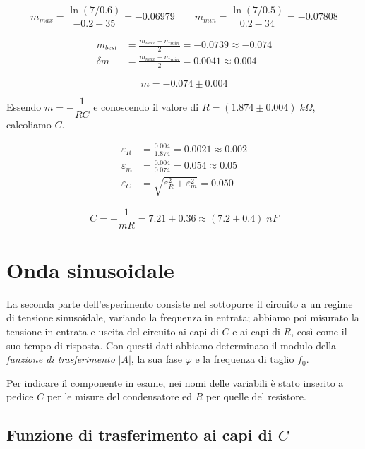 \documentclass[11pt, a4paper]{article}
\numberwithin{equation}{section} %
\begin{document}
\begin{equation*}
    m_{max} = \frac{\ln(7/0.6)}{- 0.2 - 35} = - 0.06979
    \qquad
    m_{min} = \frac{\ln(7/0.5)}{0.2 - 34} = - 0.07808
\end{equation*}

\begin{align*}
    m_{best} &= \frac{m_{max} + m_{min}}{2} = - 0.0739 \approx - 0.074 \\
    \delta m &= \frac{m_{max} - m_{min}}{2} = 0.0041 \approx 0.004
\end{align*}

\begin{equation}
    m = - 0.074 \pm 0.004
\end{equation}

\newpage

Essendo \(m = - \dfrac{1}{RC}\) e conoscendo il valore di \(R = (1.874 \pm 0.004) \; \unit{k\Omega}\), calcoliamo $C$.

\begin{align*}
    \varepsilon_R &= \frac{0.004}{1.874} = 0.0021 \approx 0.002 \\
    \varepsilon_m &= \frac{0.004}{0.074} = 0.054 \approx 0.05 \\
    \varepsilon_C &= \sqrt{\varepsilon_R^{2} + \varepsilon_m^{2}} = 0.050
\end{align*}

\begin{equation}
    C =  -\frac{1}{m R} = 7.21 \pm 0.36 \approx (7.2 \pm 0.4) \; \unit{nF}
\end{equation}

\section{Onda sinusoidale}

La seconda parte dell'esperimento consiste nel sottoporre il circuito a un regime di tensione sinusoidale, variando la frequenza in entrata; abbiamo poi misurato la tensione in entrata e uscita del circuito ai capi di $C$ e ai capi di $R$, così come il suo tempo di risposta. Con questi dati abbiamo determinato il modulo della \emph{funzione di trasferimento} $|A|$, la sua fase $\varphi$ e la frequenza di taglio $f_{0}$.

Per indicare il componente in esame, nei nomi delle variabili è stato inserito a pedice $C$ per le misure del condensatore ed $R$ per quelle del resistore.

\subsection{Funzione di trasferimento ai capi di $C$}
\end{document}
